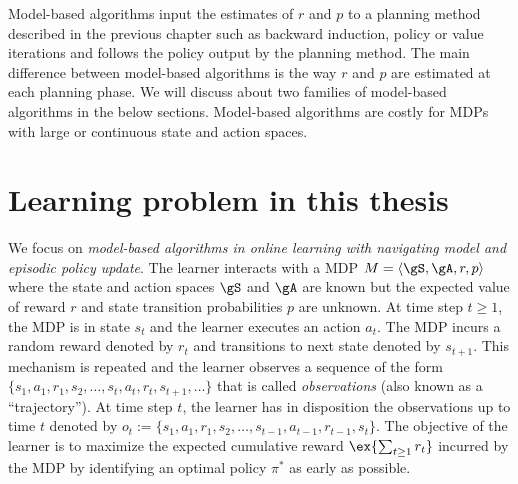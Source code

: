 Model-based algorithms input the estimates of $r$ and $p$ to a planning method described in the previous chapter such as backward induction, policy or value iterations and follows the policy output by the planning method.
The main difference between model-based algorithms is the way $r$ and $p$ are estimated at each planning phase.
We will discuss about two families of model-based algorithms in the below sections.
Model-based algorithms are costly for MDPs with large or continuous state and action spaces.

\section{Learning problem in this thesis}
\label{sec:intro_learning}

We focus on \emph{model-based algorithms in online learning with navigating model and episodic policy update}.
The learner interacts with a MDP $M=\langle\gS,\gA,r,p\rangle$ where the state and action spaces $\gS$ and $\gA$ are known but the expected value of reward $r$ and state transition probabilities $p$ are unknown.
At time step $t\ge1$, the MDP is in state $s_t$ and the learner executes an action $a_t$.
The MDP incurs a random reward denoted by $r_t$ and transitions to next state denoted by $s_{t+1}$.
This mechanism is repeated and the learner observes a sequence of the form $\{s_1,a_1,r_1,s_2,\dots,s_t,a_t,r_t,s_{t+1},\dots\}$ that is called \emph{observations} (also known as a ``trajectory'').
At time step $t$, the learner has in disposition the observations up to time $t$ denoted by $o_t:=\{s_1,a_1,r_1,s_2,\dots,s_{t-1},a_{t-1},r_{t-1},s_{t}\}$.
The objective of the learner is to maximize the expected cumulative reward $\ex{\sum_{t\ge1}r_t}$ incurred by the MDP by identifying an optimal policy $\pi^*$ as early as possible.


%

